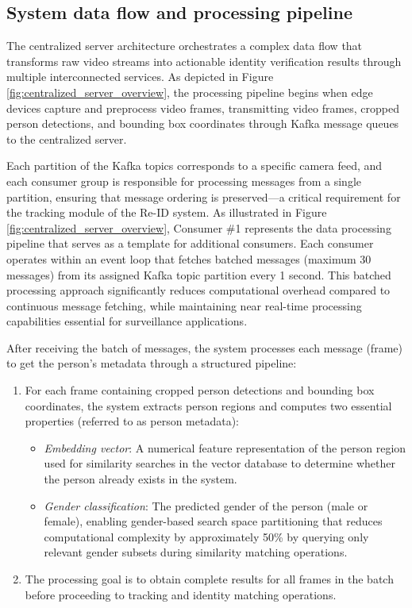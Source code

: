 \subsection{System data flow and processing pipeline}

The centralized server architecture orchestrates a complex data flow that transforms raw video streams into actionable identity verification results through multiple interconnected services. As depicted in Figure \ref{fig:centralized_server_overview}, the processing pipeline begins when edge devices capture and preprocess video frames, transmitting video frames, cropped person detections, and bounding box coordinates through Kafka message queues to the centralized server.

Each partition of the Kafka topics corresponds to a specific camera feed, and each consumer group is responsible for processing messages from a single partition, ensuring that message ordering is preserved—a critical requirement for the tracking module of the Re-ID system. As illustrated in Figure \ref{fig:centralized_server_overview}, Consumer \#1 represents the data processing pipeline that serves as a template for additional consumers. Each consumer operates within an event loop that fetches batched messages (maximum 30 messages) from its assigned Kafka topic partition every 1 second. This batched processing approach significantly reduces computational overhead compared to continuous message fetching, while maintaining near real-time processing capabilities essential for surveillance applications.

After receiving the batch of messages, the system processes each message (frame) to get the person's metadata through a structured pipeline:

\begin{enumerate}
   \item For each frame containing cropped person detections and bounding box coordinates, the system extracts person regions and computes two essential properties (referred to as person metadata):
   \begin{itemize}
       \item \textit{Embedding vector}: A numerical feature representation of the person region used for similarity searches in the vector database to determine whether the person already exists in the system.
       \item \textit{Gender classification}: The predicted gender of the person (male or female), enabling gender-based search space partitioning that reduces computational complexity by approximately 50\% by querying only relevant gender subsets during similarity matching operations.
   \end{itemize}
   \item The processing goal is to obtain complete results for all frames in the batch before proceeding to tracking and identity matching operations.
\end{enumerate}

